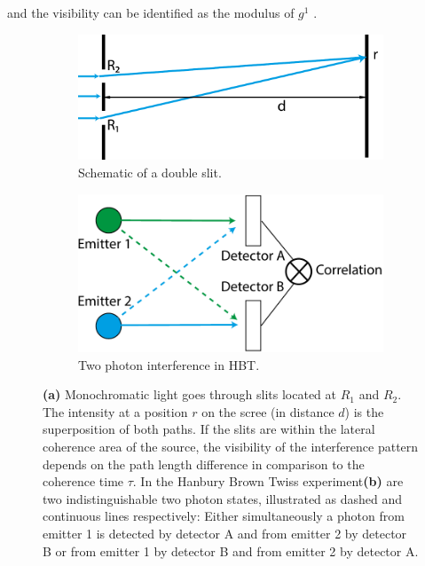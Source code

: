 and the visibility can be identified as the modulus of $g^1$ \cite{loudon2000,ou2017}.

\begin{figure}
	\centering
	\begin{subfigure}[b]{0.53\textwidth}
	\includegraphics[width=\linewidth]{images/doubleslit.pdf}
	\caption[Schematic of a lit]{Schematic of a double slit.}
	\label{fig:doubleslit}
	\end{subfigure}
\begin{subfigure}[b]{0.41\textwidth}
	\includegraphics[width=\linewidth]{images/correlation.pdf}
	\caption{Two photon interference in HBT.}
	\label{fig:twophoton}
\end{subfigure}
\caption[Schematic of double slit and two photon interference in  HBT experiments]{\textbf{(a)} Monochromatic light goes through slits located at $R_1$ and $R_2$. The intensity at a position $r$ on the scree (in distance $d$) is the superposition of both paths.  If the slits are within the lateral coherence area of the source, the visibility of the interference pattern depends on the path length difference in comparison to the coherence time $\tau$.
In the Hanbury Brown Twiss experiment\textbf{(b)} are two indistinguishable two photon states, illustrated as dashed and  continuous lines respectively: Either simultaneously a photon from emitter 1 is detected by detector A and from emitter 2 by detector B or from emitter 1 by detector B and from emitter 2 by detector A.}
\end{figure}



